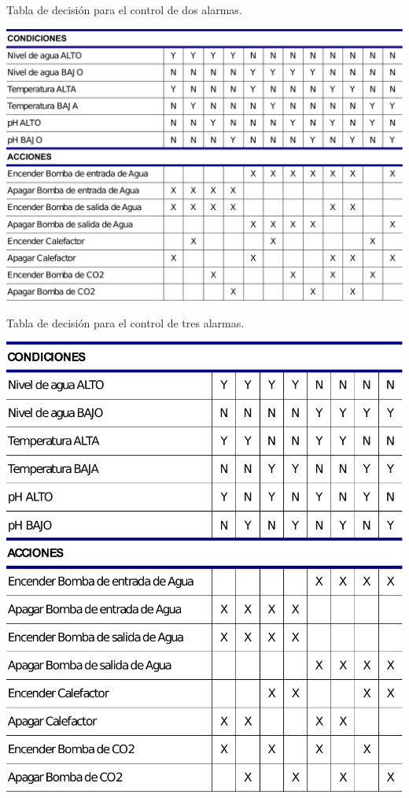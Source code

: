 \begin{table}[h]
\centering
\caption{Tabla de decisión para el control de dos alarmas.}
\includegraphics[height=.4\textheight]{./Figures/tabla2alarmas.pdf}
\label{tab:2alarmas}
\end{table}

\begin{table}[h!]
	\centering
	\caption{Tabla de decisión para el control de tres alarmas.}
    \includegraphics[height=.5\textheight]{./Figures/tabla3alarmas.pdf}
	\label{tab:3alarmas}
\end{table}

